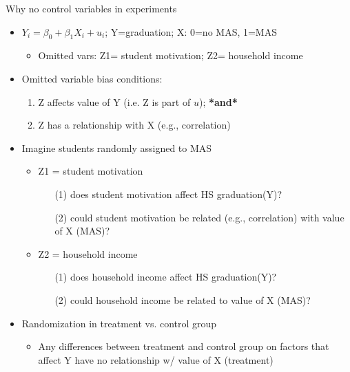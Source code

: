\begin{frame}[shrink=10]{Why no control variables in experiments}
	\begin{itemize}
	\item $Y_{i} = \beta_{0} + \beta_{1}X_{i} + u_{i}$; Y=graduation; X: 0=no MAS, 1=MAS
		\begin{itemize}
		\item Omitted vars: Z1= student motivation; Z2= household income
		\end{itemize}
	\item Omitted variable bias conditions:
		\begin{enumerate}
		\item Z affects value of Y (i.e. Z is part of $u$); \textbf{*and*}
		\item Z has a relationship with X (e.g., correlation)
		\end{enumerate}
	\item Imagine students randomly assigned to MAS
		\begin{itemize}
		\item Z1 = student motivation
			\begin{itemize}
			\item[(1)] does student motivation affect HS graduation(Y)?
			\item[(2)] could student motivation be related (e.g., correlation) with value of X (MAS)?
			\end{itemize}
		\item Z2 = household income
			\begin{itemize}
			\item[(1)] does household income affect HS graduation(Y)?
			\item[(2)] could household income be related to value of X (MAS)?
			\end{itemize}
		\end{itemize}
	\item Randomization in treatment vs. control group
		\begin{itemize}
		\item Any differences between treatment and control group on factors that affect Y have no relationship w/ value of X (treatment)
		\end{itemize}
	\end{itemize}
\end{frame}



